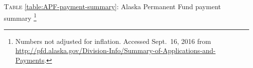 \documentclass[11pt,letterpaper,oneside]{article}
\begin{document}
\noindent\begin{minipage}{\textwidth}
	\centering
	\label{table:APF-payment-summary}
	\textsc{Table} \ref{table:APF-payment-summary}: Alaska Permanent Fund payment summary%
	\footnote{Numbers not adjusted for inflation. Accessed Sept.\ 16, 2016 from \url{http://pfd.alaska.gov/Division-Info/Summary-of-Applications-and-Payments}.}
	
	\vspace{1em}
    
\end{minipage}

\printbibliography
\end{document}
